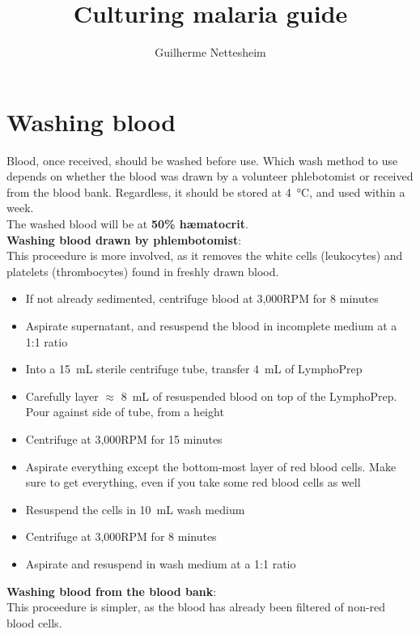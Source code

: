 \documentclass{article}
\author{Guilherme Nettesheim}
\title{Culturing malaria guide}
\begin{document}
\maketitle

\section{Washing blood}

Blood, once received, should be washed before use. Which wash method to use depends on whether the blood was drawn by a volunteer phlebotomist or received from the blood bank. Regardless, it should be stored at \SI{4}{\celsius}, and used within a week.\\

The washed blood will be at \textbf{50\% h{\ae}matocrit}.\\

\textbf{Washing blood drawn by phlembotomist}:\\

This proceedure is more involved, as it removes the white cells (leukocytes) and platelets (thrombocytes) found in freshly drawn blood.

\begin{itemize}
	\item If not already sedimented, centrifuge blood at 3,000RPM for 8 minutes
	\item Aspirate supernatant, and resuspend the blood in incomplete medium at a 1:1 ratio
	\item Into a \SI{15}{mL} sterile centrifuge tube, transfer \SI{4}{mL} of LymphoPrep
	\item Carefully layer $\approx$ \SI{8}{mL} of resuspended blood on top of the LymphoPrep. Pour against side of tube, from a height
	\item Centrifuge at 3,000RPM for 15 minutes
	\item Aspirate everything except the bottom-most layer of red blood cells. Make sure to get everything, even if you take some red blood cells as well
	\item Resuspend the cells in \SI{10}{mL} wash medium
	\item Centrifuge at 3,000RPM for 8 minutes
	\item Aspirate and resuspend in wash medium at a 1:1 ratio
\end{itemize}

\textbf{Washing blood from the blood bank}:\\

This proceedure is simpler, as the blood has already been filtered of non-red blood cells.
\end{document}
